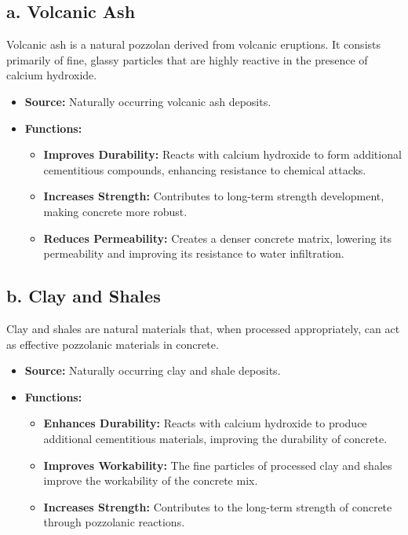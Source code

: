\documentclass[a4paper,11pt]{book}
\begin{document}
\subsection*{a. Volcanic Ash}
Volcanic ash is a natural pozzolan derived from volcanic eruptions. It consists primarily of fine, glassy particles that are highly reactive in the presence of calcium hydroxide.
\begin{itemize}
    \item \textbf{Source:} Naturally occurring volcanic ash deposits.
    \item \textbf{Functions:}
        \begin{itemize}
            \item \textbf{Improves Durability:} Reacts with calcium hydroxide to form additional cementitious compounds, enhancing resistance to chemical attacks.
            \item \textbf{Increases Strength:} Contributes to long-term strength development, making concrete more robust.
            \item \textbf{Reduces Permeability:} Creates a denser concrete matrix, lowering its permeability and improving its resistance to water infiltration.
        \end{itemize}
\end{itemize}

\subsection*{b. Clay and Shales}
Clay and shales are natural materials that, when processed appropriately, can act as effective pozzolanic materials in concrete.
\begin{itemize}
    \item \textbf{Source:} Naturally occurring clay and shale deposits.
    \item \textbf{Functions:}
        \begin{itemize}
            \item \textbf{Enhances Durability:} Reacts with calcium hydroxide to produce additional cementitious materials, improving the durability of concrete.
            \item \textbf{Improves Workability:} The fine particles of processed clay and shales improve the workability of the concrete mix.
            \item \textbf{Increases Strength:} Contributes to the long-term strength of concrete through pozzolanic reactions.
        \end{itemize}
\end{itemize}
\end{document}
